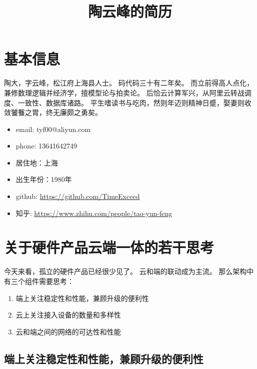 \documentclass[scheme=plain]{ctexart}
\title{陶云峰的简历}
\begin{document}
\maketitle

\section{基本信息}

陶大，字云峰，松江府上海县人士。
码代码三十有二年矣。
而立前得高人点化，兼修数理逻辑并经济学，擅模型论与拍卖论。
后恰云计算军兴，从阿里云转战调度、一致性、数据库诸路。
平生嗜读书与吃肉，然则年迈则精神日蹙，娶妻则收敛饕餮之胃，终无廉颇之勇矣。

\begin{itemize}
    \item email: tyf00@aliyun.com
    \item phone: 13641642749
    \item 居住地：上海
    \item 出生年份：1980年
    \item github: \url{https://github.com/TimeExceed}
    \item 知乎: \url{https://www.zhihu.com/people/tao-yun-feng}
\end{itemize}

\section{关于硬件产品云端一体的若干思考}

今天来看，孤立的硬件产品已经很少见了。
云和端的联动成为主流。
那么架构中有三个组件需要思考：
\begin{enumerate}
    \item 端上关注稳定性和性能，兼顾升级的便利性
    \item 云上关注接入设备的数量和多样性
    \item 云和端之间的网络的可达性和性能
\end{enumerate}

\subsection{端上关注稳定性和性能，兼顾升级的便利性}
\end{document}
